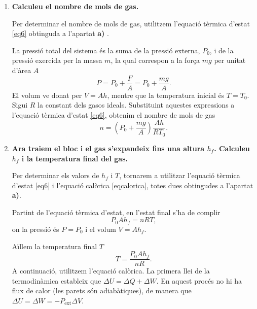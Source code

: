 \documentclass[a4paper, 10pt]{article}
\begin{document}
\begin{enumerate}[leftmargin=0pt,label=\arabic*.,labelsep=0.5em,before=\setlength{\parindent}{0pt}]

	\item \textbf{Calculeu el nombre de mols de gas.}
	
	Per determinar el nombre de mols de gas, utilitzem l’equació tèrmica d’estat \eqref{eq6} obtinguda a l’apartat \textbf{a)} . 
	
	La pressió total del sistema és la suma de la pressió externa, $P_0$, i de la pressió exercida per la massa $m$, la qual correspon a la força $mg$ per unitat d’àrea $A$
	\begin{equation}
		P = P_0 + \frac{F}{A} = P_0 + \frac{mg}{A}.
	\label{eq22}
	\end{equation}
	El volum ve donat per $V = A h$, mentre que la temperatura inicial és $T = T_0$. Sigui $R$ la constant dels gasos ideals. Substituint aquestes expressions a l’equació tèrmica d’estat \eqref{eq6}, obtenim el nombre de mols de gas
	\begin{equation}
		\boxed{n = \left(P_0 + \frac{mg}{A} \right)\frac{A h}{R T_0}}. \label{eqn}
	\end{equation}
	
	\item \textbf{Ara traiem el bloc i el gas s'expandeix fins una altura $h_f$. Calculeu $h_f$ i la temperatura final del gas.}

	Per determinar els valors de $h_f$ i $T$, tornarem a utilitzar l’equació tèrmica d’estat \eqref{eq6} i l’equació calòrica \eqref{eqcalorica}, totes dues obtingudes a l’apartat \textbf{a)}.
	
	Partint de l’equació tèrmica d’estat, en l’estat final s’ha de complir
	\begin{equation}
		P_0 A h_f = nRT,
	\end{equation}
	on la pressió és $P = P_0$ i el volum $V = A h_f$.
	
	Aïllem la temperatura final $T$ 
	\begin{equation}
		T = \frac{P_0 A h_f}{nR} \label{eqT}.
	\end{equation}
	A continuació, utilitzem l’equació calòrica. La primera llei de la termodinàmica estableix que $\Delta U = \Delta Q + \Delta W$. En aquest procés no hi ha flux de calor (les parets són adiabàtiques), de manera que $\Delta U = \Delta W = -P_{\text{ext}} \Delta V$.
	

\end{enumerate}
\end{document}
